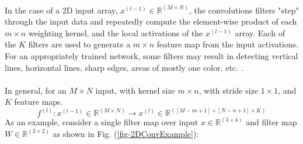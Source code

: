 \documentclass[12pt,letterpaper]{article}
\begin{document}
\paragraph*{}In the case of a 2D input array, $x^{(l-1)} \in \mathbb{R}^{(M \times N)}$, the convolutions filters "step" through the input data and repeatedly compute the element-wise product of each $m \times n$ weighting kernel, and the local activations of the $x^{(l-1)}$ array. Each of the $K$ filters are used to generate a $m \times n$ feature map from the input activations. For an appropriately trained network, some filters may result in detecting vertical lines, horizontal lines, sharp edges, areas of mostly one color, etc. \cite{Geron,Loy}.

\paragraph*{}In general, for an $M \times N$ input, with kernel size $m \times n$, with stride size $1 \times 1$, and $K$ feature maps.
\begin{equation}
f^{(l)} : x^{(l-1)} \in \mathbb{R}^{(M \times N)} \rightarrow
x^{(l)} \in \mathbb{R}^{([M-m+1] \times [N-n+1] \times K)}
\end{equation}
As an example, consider a single filter map over input $x \in \mathbb{R}^{(3 \times 4)}$ and filter map $W \in \mathbb{R}^{(2 \times 2)}$ as shown in Fig. (\ref{fig-2DConvExample}):
\end{document}
